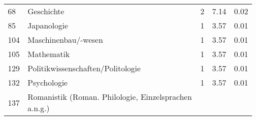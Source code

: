 \begin{longtable}{lXrrr}
     68 &
     \multicolumn{1}{X}{ Geschichte   } &


       \num{2} &
       \num[round-mode=places,round-precision=2]{7,14} &
         \num[round-mode=places,round-precision=2]{0,02} \\

     85 &
     \multicolumn{1}{X}{ Japanologie   } &


       \num{1} &
       \num[round-mode=places,round-precision=2]{3,57} &
         \num[round-mode=places,round-precision=2]{0,01} \\

     104 &
     \multicolumn{1}{X}{ Maschinenbau/-wesen   } &


       \num{1} &
       \num[round-mode=places,round-precision=2]{3,57} &
         \num[round-mode=places,round-precision=2]{0,01} \\

     105 &
     \multicolumn{1}{X}{ Mathematik   } &


       \num{1} &
       \num[round-mode=places,round-precision=2]{3,57} &
         \num[round-mode=places,round-precision=2]{0,01} \\

     129 &
     \multicolumn{1}{X}{ Politikwissenschaften/Politologie   } &


       \num{1} &
       \num[round-mode=places,round-precision=2]{3,57} &
         \num[round-mode=places,round-precision=2]{0,01} \\

     132 &
     \multicolumn{1}{X}{ Psychologie   } &


       \num{1} &
       \num[round-mode=places,round-precision=2]{3,57} &
         \num[round-mode=places,round-precision=2]{0,01} \\

     137 &
     \multicolumn{1}{X}{ Romanistik (Roman. Philologie, Einzelsprachen a.n.g.)   } &



\end{longtable}
